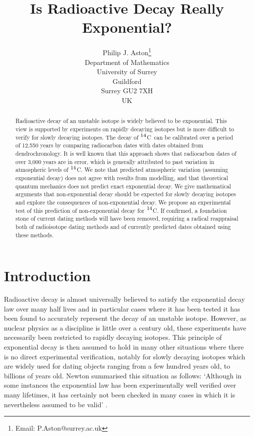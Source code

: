 \documentclass[12pt]{article}
\title{Is Radioactive Decay Really Exponential?}
\author{Philip J. Aston\thanks{Email: P.Aston@surrey.ac.uk}\\
Department of Mathematics\\
University of Surrey\\
Guildford\\
Surrey GU2 7XH\\
UK}
\newcommand{\cft}{$^{\rm 14}$C}
\begin{document}
\maketitle

\begin{abstract}
Radioactive decay of an unstable isotope is widely believed to be 
exponential. This view is supported by experiments on rapidly decaying 
isotopes but is more difficult to verify for slowly decaying isotopes. 
The decay of \cft~can be calibrated over a period of 12,550 years by 
comparing radiocarbon dates with dates obtained from
dendrochronology. It is well known that this approach shows that
radiocarbon dates of over 3,000 years are in error, which is generally 
attributed to past variation in atmospheric levels of \cft. We note that
predicted atmospheric variation (assuming exponential decay) does not
agree with results from modelling, and that theoretical quantum mechanics
does not predict exact exponential decay. We give mathematical
arguments that non-exponential decay should be expected for slowly 
decaying isotopes and explore the consequences of non-exponential decay. 
We propose an experimental test of this
prediction of non-exponential decay for \cft. If confirmed, a foundation
stone of current dating methods will have been removed, requiring a 
radical reappraisal both of radioisotope dating methods and of 
currently predicted dates obtained using these methods.
\end{abstract}

\newpage

\section{Introduction}

Radioactive decay is almost universally believed to satisfy the exponential 
decay law over many half lives and in particular cases where it has been 
tested \cite{gopych84,norman88} it has been found to accurately represent the
decay of an unstable isotope. However, as nuclear physics as a discipline 
is little over a century old, these experiments have necessarily been 
restricted to rapidly decaying isotopes. This principle of exponential decay
is then assumed to hold in many other situations where there is no direct 
experimental verification, notably for slowly decaying isotopes which are 
widely used for dating objects ranging from a few hundred years
old, to billions of years old. Newton summarised this situation as follows:
`Although in some instances the exponential law has been experimentally well
verified over many lifetimes, it has certainly not been checked in many
cases in which it is nevertheless assumed to be valid' \cite[p608]{newton66}.
\end{document}
